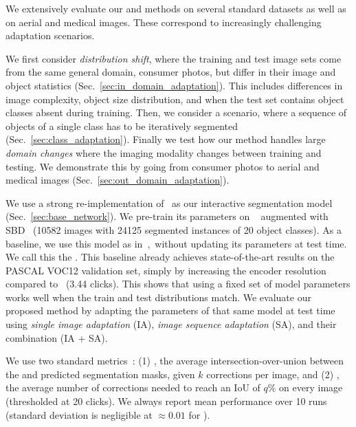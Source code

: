 We extensively evaluate our \imageSGD{} and \datasetSGD{} methods on several standard datasets as well as on aerial and medical images. These correspond to increasingly challenging adaptation scenarios.

We first consider \textit{distribution shift}, where the training and test image sets come from the same general domain, consumer photos, but differ in their image and object statistics (Sec.~\ref{sec:in_domain_adaptation}).
This includes differences in image complexity, object size distribution, and when the test set contains object classes absent during training.
Then, we consider a \textit{\classspecialisation{}} scenario, where a sequence of objects of a single class has to be iteratively segmented 
(Sec.~\ref{sec:class_adaptation}).
Finally we test how our method handles large \textit{domain changes} where the imaging modality changes between training and testing. We demonstrate this by going from consumer photos to aerial and medical images (Sec.~\ref{sec:out_domain_adaptation}).

  We use a strong re-implementation of~\cite{mahadevan18bmvc} as our interactive segmentation model (Sec.~\ref{sec:base_network}). We pre-train its parameters on \pascal{}~\cite{pascal-voc-2012} augmented with SBD~\cite{hariharan11iccv} (10582 images with 24125 segmented instances of 20 object classes).
As a baseline, we use this model as in~\cite{mahadevan18bmvc},~\ie without updating its parameters at test time.
We call this the \emph{\fixedmodellong}. This baseline already achieves state-of-the-art results on the PASCAL VOC12 validation set, simply by increasing the encoder resolution compared to~\cite{mahadevan18bmvc}
(3.44 clicks).
This shows that using a fixed set of model parameters works well when the train and test distributions match. 
We evaluate our proposed method by adapting the parameters of that same model at test time using \emph{single image adaptation} (IA), \emph{image sequence adaptation} (SA), and their combination (IA + SA).

We use
two standard metrics~\cite{xu16cvpr,liew17iccv,benard17arxiv,mahadevan18bmvc,li18cvpr,benenson19cvpr,jang19cvpr}:
(1) \textbf{\iouAtK{}}, the average intersection-over-union between the \gt{} and predicted segmentation masks, given $k$ corrections per image,
and (2) \textbf{\clicksAtIOU{}}, the average number of corrections needed to reach an IoU of $q\%$ on every image (thresholded at 20 clicks).
We always report mean performance over 10 runs (standard deviation is negligible at $\approx0.01$ for \clicksAtIOU{}).

